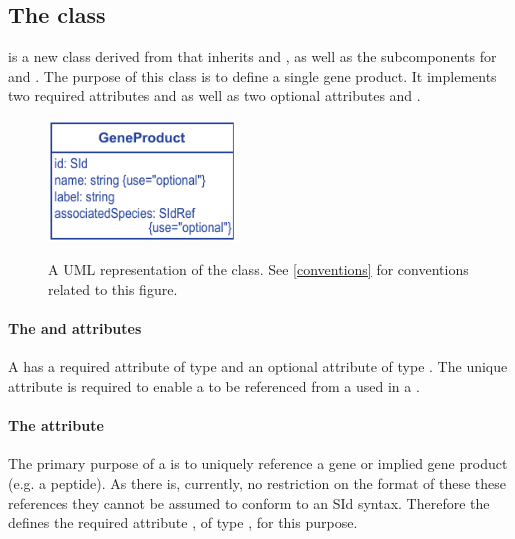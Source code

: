 \begin{newsection}
\subsection{The \FBC {} class}
\label{geneproduct-class}
\GeneProduct is a new \FBC class derived from \SBML \SBase that inherits
 and , as well as the subcomponents for
\Annotation and \Notes. The purpose of this class is to define a single gene
product. It implements two required attributes  and  as
well as two optional attributes  and .

\begin{figure}[h]
  \centering
  \includegraphics[width=5cm]{images/v2harmony_fbc_geneproduct.pdf}\\
  \caption{A UML representation of the \FBCPackage \GeneProduct class. See
  \ref{conventions} for conventions related to this figure.}
  \label{fig:fbc_uml_geneproduct}
\end{figure}

\paragraph{The  and  attributes}
A \GeneProduct has a required attribute  of type  
and an optional attribute  of type . The 
unique  attribute is required to enable a \GeneProduct to be 
referenced from a \GeneProductRef used in a \GeneProteinAssociation.

\paragraph{The  attribute}
The primary purpose of a \GeneProduct is to uniquely reference a gene or 
implied gene product (e.g. a peptide). As there is, currently, no 
restriction on the format of these these references they cannot be 
assumed to conform to an \SBML SId syntax. Therefore the \FBCPackage 
defines the required attribute , of type , 
for this purpose.


\end{newsection}
